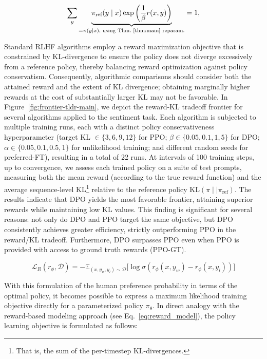 \begin{equation}\label{eq:lag_p}
     \sum_{y}\underbrace{\pi_\text{ref}(y\mid x)\exp\left(\frac{1}{\beta}r(x, y)\right)}_{=\pi(y\mid x)\text{, using Thm.~\ref{thm:main} reparam.}} = 1,
\end{equation}

Standard RLHF algorithms employ a reward maximization objective that is constrained by KL-divergence to ensure the policy does not diverge excessively from a reference policy, thereby balancing reward optimization against policy conservatism. Consequently, algorithmic comparisons should consider both the attained reward and the extent of KL divergence; obtaining marginally higher rewards at the cost of substantially larger KL may not be favorable. In Figure~\ref{fig:frontier-tldr-main}, we depict the reward-KL tradeoff frontier for several algorithms applied to the sentiment task. Each algorithm is subjected to multiple training runs, each with a distinct policy conservativeness hyperparameter (target KL $\in\{3,6,9,12\}$ for PPO; $\beta \in \{0.05,0.1,1,5\}$ for DPO; $\alpha\in\{0.05,0.1,0.5,1\}$ for unlikelihood training; and different random seeds for preferred-FT), resulting in a total of 22 runs. At intervals of 100 training steps, up to convergence, we assess each trained policy on a suite of test prompts, measuring both the mean reward (according to the true reward function) and the average sequence-level KL\footnote{That is, the sum of the per-timestep KL-divergences.} relative to the reference policy $\text{KL}\left(\pi\mid \mid \pi_\text{ref}\right)$. The results indicate that DPO yields the most favorable frontier, attaining superior rewards while maintaining low KL values. This finding is significant for several reasons: not only do DPO and PPO target the same objective, but DPO consistently achieves greater efficiency, strictly outperforming PPO in the reward/KL tradeoff. Furthermore, DPO surpasses PPO even when PPO is provided with access to ground truth rewards (PPO-GT).

\begin{equation}\label{eq:reward_model}
    \mathcal{L}_R(r_{\phi}, \mathcal{D}) = -\mathbb{E}_{(x, y_w, y_l)\sim \mathcal{D}}\bigl[\log \sigma(r_{\phi}(x, y_w)- r_{\phi}(x, y_l))\bigr]
\end{equation}

With this formulation of the human preference probability in terms of the optimal policy, it becomes possible to express a maximum likelihood training objective directly for a parameterized policy $\pi_\theta$. In direct analogy with the reward-based modeling approach (see Eq.~\ref{eq:reward_model}), the policy learning objective is formulated as follows:

